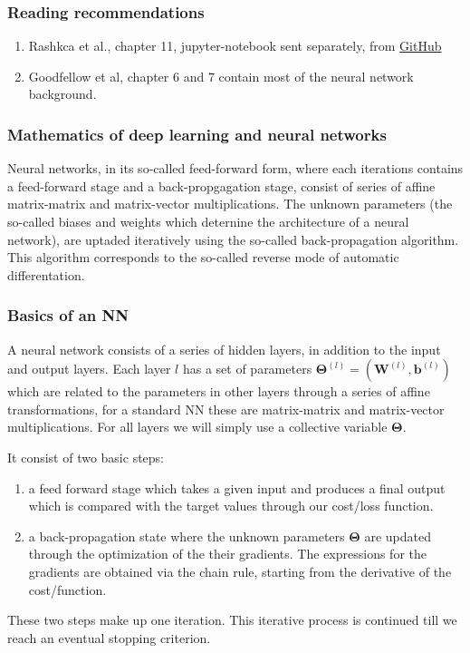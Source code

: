 \documentclass{beamer}
\begin{document}
\begin{frame}
\frametitle{Reading recommendations}

\begin{enumerate}
\item Rashkca et al., chapter 11, jupyter-notebook sent separately, from \href{{https://github.com/rasbt/machine-learning-book}}{GitHub}

\item Goodfellow et al, chapter 6 and 7 contain most of the neural network background.
\end{enumerate}

\noindent
\end{frame}

\begin{frame}
\frametitle{Mathematics of deep learning and neural networks}

Neural networks, in its so-called feed-forward form, where each
iterations contains a feed-forward stage and a back-propgagation
stage, consist of series of affine matrix-matrix and matrix-vector
multiplications. The unknown parameters (the so-called biases and
weights which deternine the architecture of a neural network), are
uptaded iteratively using the so-called back-propagation algorithm.
This algorithm corresponds to the so-called reverse mode of 
automatic differentation.
\end{frame}

\begin{frame}
\frametitle{Basics of an NN}

A neural network consists of a series of hidden layers, in addition to
the input and output layers.  Each layer $l$ has a set of parameters
$\bm{\Theta}^{(l)}=(\bm{W}^{(l)},\bm{b}^{(l)})$ which are related to the
parameters in other layers through a series of affine transformations,
for a standard NN these are matrix-matrix and matrix-vector
multiplications.  For all layers we will simply use a collective variable $\bm{\Theta}$.

It consist of two basic steps:
\begin{enumerate}
\item a feed forward stage which takes a given input and produces a final output which is compared with the target values through our cost/loss function.

\item a back-propagation state where the unknown parameters $\bm{\Theta}$ are updated through the optimization of the their gradients. The expressions for the gradients are obtained via the chain rule, starting from the derivative of the cost/function.
\end{enumerate}

\noindent
These two steps make up one iteration. This iterative process is continued till we reach an eventual stopping criterion.
\end{frame}
\end{document}
